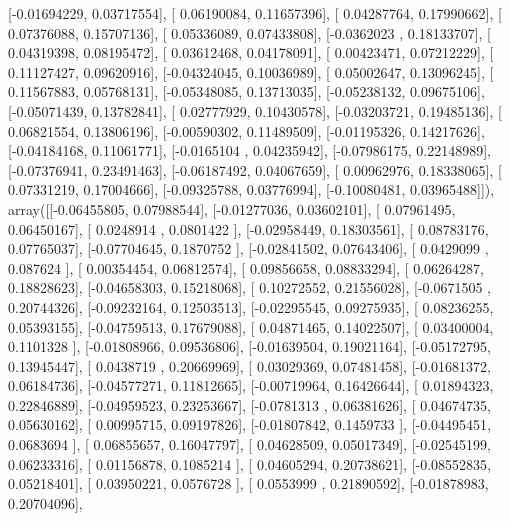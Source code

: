 \documentclass{article}
\begin{document}
       [-0.01694229,  0.03717554],
       [ 0.06190084,  0.11657396],
       [ 0.04287764,  0.17990662],
       [ 0.07376088,  0.15707136],
       [ 0.05336089,  0.07433808],
       [-0.0362023 ,  0.18133707],
       [ 0.04319398,  0.08195472],
       [ 0.03612468,  0.04178091],
       [ 0.00423471,  0.07212229],
       [ 0.11127427,  0.09620916],
       [-0.04324045,  0.10036989],
       [ 0.05002647,  0.13096245],
       [ 0.11567883,  0.05768131],
       [-0.05348085,  0.13713035],
       [-0.05238132,  0.09675106],
       [-0.05071439,  0.13782841],
       [ 0.02777929,  0.10430578],
       [-0.03203721,  0.19485136],
       [ 0.06821554,  0.13806196],
       [-0.00590302,  0.11489509],
       [-0.01195326,  0.14217626],
       [-0.04184168,  0.11061771],
       [-0.0165104 ,  0.04235942],
       [-0.07986175,  0.22148989],
       [-0.07376941,  0.23491463],
       [-0.06187492,  0.04067659],
       [ 0.00962976,  0.18338065],
       [ 0.07331219,  0.17004666],
       [-0.09325788,  0.03776994],
       [-0.10080481,  0.03965488]]), array([[-0.06455805,  0.07988544],
       [-0.01277036,  0.03602101],
       [ 0.07961495,  0.06450167],
       [ 0.0248914 ,  0.0801422 ],
       [-0.02958449,  0.18303561],
       [ 0.08783176,  0.07765037],
       [-0.07704645,  0.1870752 ],
       [-0.02841502,  0.07643406],
       [ 0.0429099 ,  0.087624  ],
       [ 0.00354454,  0.06812574],
       [ 0.09856658,  0.08833294],
       [ 0.06264287,  0.18828623],
       [-0.04658303,  0.15218068],
       [ 0.10272552,  0.21556028],
       [-0.0671505 ,  0.20744326],
       [-0.09232164,  0.12503513],
       [-0.02295545,  0.09275935],
       [ 0.08236255,  0.05393155],
       [-0.04759513,  0.17679088],
       [ 0.04871465,  0.14022507],
       [ 0.03400004,  0.1101328 ],
       [-0.01808966,  0.09536806],
       [-0.01639504,  0.19021164],
       [-0.05172795,  0.13945447],
       [ 0.0438719 ,  0.20669969],
       [ 0.03029369,  0.07481458],
       [-0.01681372,  0.06184736],
       [-0.04577271,  0.11812665],
       [-0.00719964,  0.16426644],
       [ 0.01894323,  0.22846889],
       [-0.04959523,  0.23253667],
       [-0.0781313 ,  0.06381626],
       [ 0.04674735,  0.05630162],
       [ 0.00995715,  0.09197826],
       [-0.01807842,  0.1459733 ],
       [-0.04495451,  0.0683694 ],
       [ 0.06855657,  0.16047797],
       [ 0.04628509,  0.05017349],
       [-0.02545199,  0.06233316],
       [ 0.01156878,  0.1085214 ],
       [ 0.04605294,  0.20738621],
       [-0.08552835,  0.05218401],
       [ 0.03950221,  0.0576728 ],
       [ 0.0553999 ,  0.21890592],
       [-0.01878983,  0.20704096],
\end{document}
